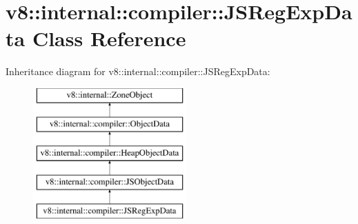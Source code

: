 \hypertarget{classv8_1_1internal_1_1compiler_1_1JSRegExpData}{}\section{v8\+:\+:internal\+:\+:compiler\+:\+:J\+S\+Reg\+Exp\+Data Class Reference}
\label{classv8_1_1internal_1_1compiler_1_1JSRegExpData}
Inheritance diagram for v8\+:\+:internal\+:\+:compiler\+:\+:J\+S\+Reg\+Exp\+Data\+:\begin{figure}[H]
\begin{center}
\leavevmode
\includegraphics[height=5.000000cm]{classv8_1_1internal_1_1compiler_1_1JSRegExpData}
\end{center}
\end{figure}
